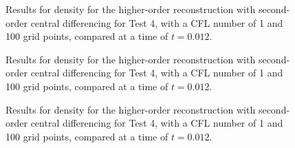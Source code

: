 \begin{figure}
	\caption[Results for density for the higher-order reconstruction with second-order central differencing for Test 4, with a CFL number of 1 and 100 grid points, compared at a time of $t=0.012$.]{Results for density for the higher-order reconstruction with second-order central differencing for Test 4, with a CFL number of 1 and 100 grid points, compared at a time of $t=0.012$.}
	\label{fig:Test5HORCD2velocity}
\end{figure}

\begin{figure}
	\caption[Results for density for the higher-order reconstruction with second-order central differencing for Test 4, with a CFL number of 1 and 100 grid points, compared at a time of $t=0.012$.]{Results for density for the higher-order reconstruction with second-order central differencing for Test 4, with a CFL number of 1 and 100 grid points, compared at a time of $t=0.012$.}
	\label{fig:Test5HORCD2pressure}
\end{figure}

\begin{figure}
	\caption[Results for density for the higher-order reconstruction with second-order central differencing for Test 4, with a CFL number of 1 and 100 grid points, compared at a time of $t=0.012$.]{Results for density for the higher-order reconstruction with second-order central differencing for Test 4, with a CFL number of 1 and 100 grid points, compared at a time of $t=0.012$.}
	\label{fig:Test5HORCD2energy}
\end{figure}